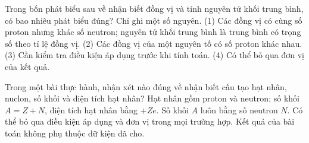 \begin{ex}
Trong bốn phát biểu sau về nhận biết đồng vị và tính nguyên tử khối trung bình, có bao nhiêu phát biểu đúng? Chỉ ghi một số nguyên. (1) Các đồng vị có cùng số proton nhưng khác số neutron; nguyên tử khối trung bình là trung bình có trọng số theo tỉ lệ đồng vị. (2) Các đồng vị của một nguyên tố có số proton khác nhau. (3) Cần kiểm tra điều kiện áp dụng trước khi tính toán. (4) Có thể bỏ qua đơn vị của kết quả.
\end{ex}

\begin{ex}
Trong một bài thực hành, nhận xét nào đúng về nhận biết cấu tạo hạt nhân, nuclon, số khối và điện tích hạt nhân?
\choice
{\True Hạt nhân gồm proton và neutron; số khối $A=Z+N$, điện tích hạt nhân bằng $+Ze$.}
{Số khối $A$ luôn bằng số neutron $N$.}
{Có thể bỏ qua điều kiện áp dụng và đơn vị trong mọi trường hợp.}
{Kết quả của bài toán không phụ thuộc dữ kiện đã cho.}
\end{ex}

